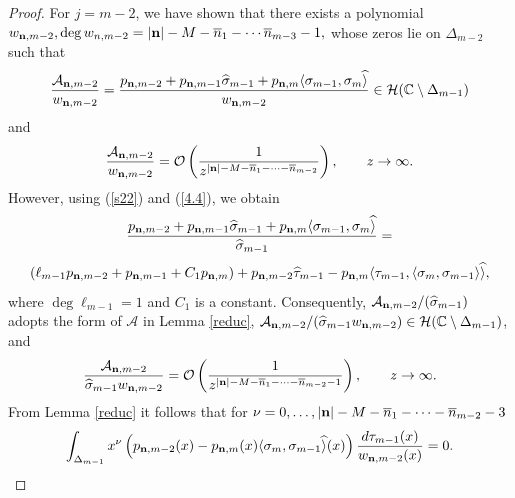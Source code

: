 \documentclass[10pt,a4paper]{article}
\theoremstyle{definition}
\theoremstyle{remark}
\numberwithin{equation}{section}
\begin{document}
\begin{proof}
For $j= m-2$, we have shown that there exists a polynomial
$w_{{\bf n},m-2}, \deg w_{n,m-2} = |{\bf n}| -M-\overline{n}_1 - \cdots \overline{n}_{m-3}- 1,$ whose zeros lie on $\Delta_{m-2} $ such that
\[ \frac{\mathcal{A}_{{\bf n},m-2}}{w_{{\bf n},m-2}} =  \frac{p_{{\bf n},m-2} + p_{{\bf n},m-1} \widehat{\sigma}_{m-1} + p_{{\bf n},m} \langle \sigma_{m-1},\sigma_m\widehat{\rangle}}{w_{{\bf n},m-2}} \in \mathcal{H}(\mathbb{C} \setminus \Delta_{m-1})
\]
and
\[  \frac{\mathcal{A}_{{\bf n},m-2}}{w_{{\bf n},m-2}} = \mathcal{O}\left(\frac{1}{z^{|{\bf n}|-M - \overline{n}_1 - \cdots-\overline{n}_{m-2}}}\right), \qquad z \to \infty.
\]
However, using (\ref{s22}) and (\ref{4.4}), we obtain
\[\frac{p_{{\bf n},m-2} + p_{{\bf n},m-1} \widehat{\sigma}_{m-1} + p_{{\bf n},m} \langle \sigma_{m-1},\sigma_m\widehat{\rangle}}{\widehat{\sigma}_{m-1}} =
\]
\[
(\ell_{m-1} p_{{\bf n},m-2}+ p_{{\bf n},m-1} + C_1 p_{{\bf n},m})+ p_{{\bf n},m-2}\widehat{\tau}_{m-1}     - p_{{\bf n},m} \langle  {\tau}_{m-1}, \langle \sigma_{m}, \sigma_{m-1} \rangle \widehat{\rangle},
\]
where $\deg \ell_{m-1} = 1$ and $C_1$ is a constant. Consequently, $  {\mathcal{A}_{{\bf n},m-2}}/(\widehat{\sigma}_{m-1}) $ adopts the form of $\mathcal{A}$ in Lemma \ref{reduc}, $ {\mathcal{A}_{{\bf n},m-2}}/({\widehat{\sigma}_{m-1}w_{{\bf n},m-2} }) \in \mathcal{H}(\mathbb{C} \setminus \Delta_{m-1})$,   and
\begin{equation} \label{Anm} \frac{\mathcal{A}_{{\bf n},m-2}}{\widehat{\sigma}_{m-1}w_{{\bf n},m-2}} = \mathcal{O}\left(\frac{1}{z^{|{\bf n}| -M- \overline{n}_1 - \cdots-\overline{n}_{m-2} -1}}\right), \qquad z \to \infty.
\end{equation}
From  Lemma \ref{reduc} it follows that for $ \nu = 0,\ldots, |{\bf n}| -M- \overline{n}_1 - \cdots-\overline{n}_{m-2} -3$
\[ \int_{\Delta_{m-1}} x^{\nu}  \left({p_{{\bf n},m-2}(x)     - p_{{\bf n},m}(x)   \langle \sigma_{m}, \sigma_{m-1} \widehat{\rangle}(x)} \right) \frac{d  \tau_{m-1}(x)}{w_{{\bf n},m-2}(x)} = 0.
\]


\end{proof}
\end{document}
